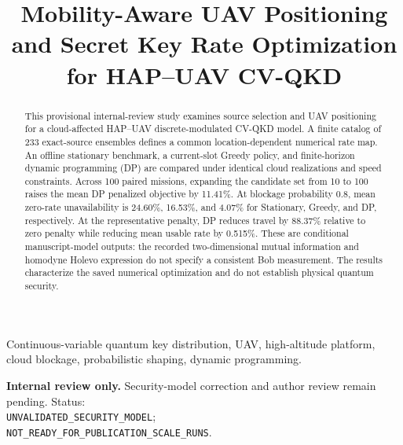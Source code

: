 \documentclass[conference,a4paper]{IEEEtran}
\title{Mobility-Aware UAV Positioning and Secret Key Rate Optimization for HAP--UAV CV-QKD}
\author{\IEEEauthorblockN{TBD\IEEEauthorrefmark{1},
TBD\IEEEauthorrefmark{2}}
\IEEEauthorblockA{\IEEEauthorrefmark{1}XXX}
\IEEEauthorblockA{\IEEEauthorrefmark{2}Computer Communications Laboratory,
The University of Aizu, Aizuwakamatsu 965-8580, Japan}}
\begin{document}
\maketitle
\begin{abstract}
This provisional internal-review study examines source selection and UAV positioning for a cloud-affected HAP--UAV discrete-modulated CV-QKD model. A finite catalog of 233 exact-source ensembles defines a common location-dependent numerical rate map. An offline stationary benchmark, a current-slot Greedy policy, and finite-horizon dynamic programming (DP) are compared under identical cloud realizations and speed constraints. Across 100 paired missions, expanding the candidate set from 10 to 100 raises the mean DP penalized objective by 11.41\%. At blockage probability 0.8, mean zero-rate unavailability is 24.60\%, 16.53\%, and 4.07\% for Stationary, Greedy, and DP, respectively. At the representative penalty, DP reduces travel by 88.37\% relative to zero penalty while reducing mean usable rate by 0.515\%. These are conditional manuscript-model outputs: the recorded two-dimensional mutual information and homodyne Holevo expression do not specify a consistent Bob measurement. The results characterize the saved numerical optimization and do not establish physical quantum security.
\end{abstract}
\begin{IEEEkeywords}
Continuous-variable quantum key distribution, UAV, high-altitude platform, cloud blockage, probabilistic shaping, dynamic programming.
\end{IEEEkeywords}
\noindent\textbf{Internal review only.} Security-model correction and author review remain pending. Status:\\
{\footnotesize\texttt{UNVALIDATED\_SECURITY\_MODEL};}\\
{\footnotesize\texttt{NOT\_READY\_FOR\_PUBLICATION\_SCALE\_RUNS}.}




\end{document}
